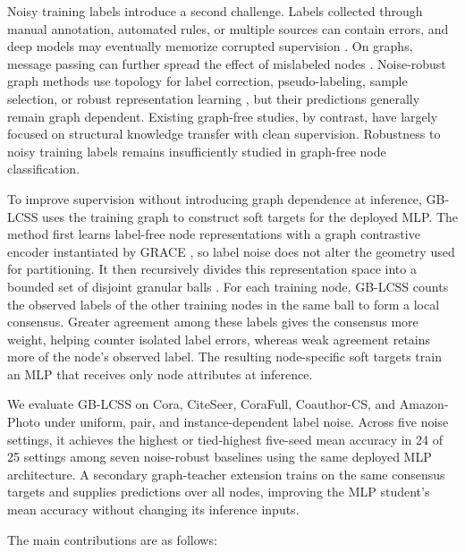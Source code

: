 \documentclass[10pt,letterpaper]{elsarticle}
\begin{document}
Noisy training labels introduce a second challenge. Labels collected through manual annotation, automated rules, or multiple sources can contain errors, and deep models may eventually memorize corrupted supervision \cite{ref8}. On graphs, message passing can further spread the effect of mislabeled nodes \cite{ref13}. Noise-robust graph methods use topology for label correction, pseudo-labeling, sample selection, or robust representation learning \cite{ref9,ref10,ref11,ref12,ref47}, but their predictions generally remain graph dependent. Existing graph-free studies, by contrast, have largely focused on structural knowledge transfer with clean supervision. Robustness to noisy training labels remains insufficiently studied in graph-free node classification.

To improve supervision without introducing graph dependence at inference, GB-LCSS uses the training graph to construct soft targets for the deployed MLP. The method first learns label-free node representations with a graph contrastive encoder instantiated by GRACE \cite{ref16}, so label noise does not alter the geometry used for partitioning. It then recursively divides this representation space into a bounded set of disjoint granular balls \cite{ref34}. For each training node, GB-LCSS counts the observed labels of the other training nodes in the same ball to form a local consensus. Greater agreement among these labels gives the consensus more weight, helping counter isolated label errors, whereas weak agreement retains more of the node's observed label. The resulting node-specific soft targets train an MLP that receives only node attributes at inference.

We evaluate GB-LCSS on Cora, CiteSeer, CoraFull, Coauthor-CS, and Amazon-Photo under uniform, pair, and instance-dependent label noise. Across five noise settings, it achieves the highest or tied-highest five-seed mean accuracy in 24 of 25 settings among seven noise-robust baselines using the same deployed MLP architecture. A secondary graph-teacher extension trains on the same consensus targets and supplies predictions over all nodes, improving the MLP student's mean accuracy without changing its inference inputs.

The main contributions are as follows:
\end{document}
